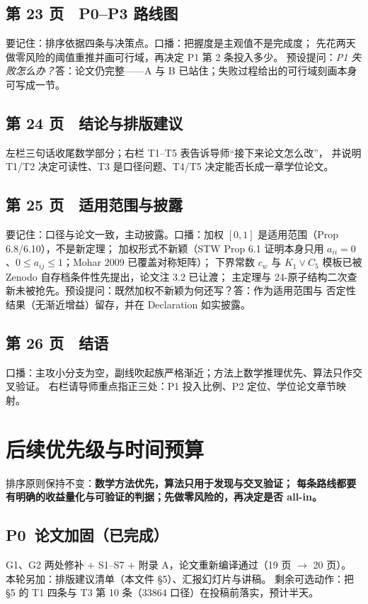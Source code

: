 \documentclass[UTF8,11pt]{ctexart}
\begin{document}
\subsection*{第 23 页　P0--P3 路线图}
要记住：排序依据四条与决策点。口播：把握度是主观值不是完成度；
先花两天做零风险的阈值重推并画可行域，再决定 P1 第 2 条投入多少。
预设提问：\emph{P1 失败怎么办？}答：论文仍完整——A 与 B 已站住；失败过程给出的可行域刻画本身可写成一节。

\subsection*{第 24 页　结论与排版建议}
左栏三句话收尾数学部分；右栏 T1--T5 表告诉导师``接下来论文怎么改''，
并说明 T1/T2 决定可读性、T3 是口径问题、T4/T5 决定能否长成一章学位论文。

\subsection*{第 25 页　适用范围与披露}
要记住：口径与论文一致，主动披露。口播：加权 $[0,1]$ 是适用范围（Prop 6.8/6.10），不是新定理；
加权形式不新颖（STW Prop 6.1 证明本身只用 $a_{ii}=0$、$0\le a_{ij}\le1$；Mohar 2009 已覆盖对称矩阵）；
下界常数 $c_w$ 与 $K_1\vee C_5$ 模板已被 Zenodo 自存档条件性先提出，论文注 3.2 已让渡；
主定理与 24-原子结构二次查新未被抢先。预设提问：既然加权不新颖为何还写？答：作为适用范围与
否定性结果（无渐近增益）留存，并在 Declaration 如实披露。

\subsection*{第 26 页　结语}
口播：主攻小分支为空，副线吹起族严格渐近；方法上数学推理优先、算法只作交叉验证。
右栏请导师重点指正三处：P1 投入比例、P2 定位、学位论文章节映射。

\section{后续优先级与时间预算}

排序原则保持不变：\textbf{数学方法优先，算法只用于发现与交叉验证；
每条路线都要有明确的收益量化与可验证的判据；先做零风险的，再决定是否 all-in。}

\subsection*{P0\ 论文加固\quad（已完成）}
G1、G2 两处修补 $+$ S1--S7 $+$ 附录 A，论文重新编译通过（19 页 $\to$ 20 页）。
本轮另加：排版建议清单（本文件 \S5）、汇报幻灯片与讲稿。
剩余可选动作：把 \S5 的 T1 四条与 T3 第 10 条（$33864$ 口径）在投稿前落实，预计半天。
\end{document}
